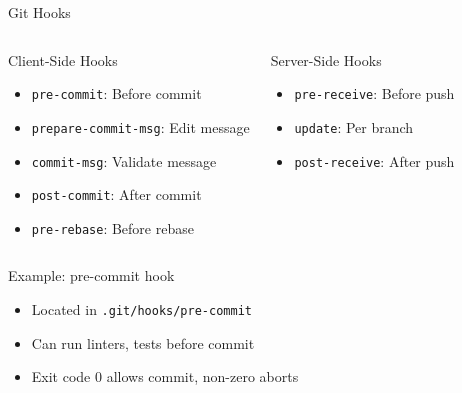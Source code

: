 \documentclass[aspectratio=169]{beamer}
\begin{document}
	\begin{frame}{Git Hooks}
		\begin{columns}[T]
			\begin{block}{Client-Side Hooks}
				\begin{itemize}
					\item \texttt{pre-commit}: Before commit
					\item \texttt{prepare-commit-msg}: Edit message
					\item \texttt{commit-msg}: Validate message
					\item \texttt{post-commit}: After commit
					\item \texttt{pre-rebase}: Before rebase
				\end{itemize}
			\end{block}
			
			\begin{block}{Server-Side Hooks}
				\begin{itemize}
					\item \texttt{pre-receive}: Before push
					\item \texttt{update}: Per branch
					\item \texttt{post-receive}: After push
				\end{itemize}
			\end{block}
		\end{columns}
		
		\begin{exampleblock}{Example: pre-commit hook}
			\begin{itemize}
				\item Located in \texttt{.git/hooks/pre-commit}
				\item Can run linters, tests before commit
				\item Exit code 0 allows commit, non-zero aborts
			\end{itemize}
		\end{exampleblock}
	\end{frame}
	
\end{document}
